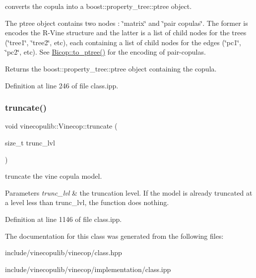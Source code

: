 converts the copula into a boost\+::property\+\_\+tree\+::ptree object. 

The {\ttfamily ptree} object contains two nodes \+: {\ttfamily \char`\"{}matrix\char`\"{}} and {\ttfamily \char`\"{}pair copulas\char`\"{}}. The former is encodes the R-\/\+Vine structure and the latter is a list of child nodes for the trees ({\ttfamily \char`\"{}tree1\char`\"{}}, {\ttfamily \char`\"{}tree2\char`\"{}}, etc), each containing a list of child nodes for the edges ({\ttfamily \char`\"{}pc1\char`\"{}}, {\ttfamily \char`\"{}pc2\char`\"{}}, etc). See \hyperlink{classvinecopulib_1_1_bicop_a74397cf5f843f5aebb436a49322dd2f9}{Bicop\+::to\+\_\+ptree()} for the encoding of pair-\/copulas.

\begin{DoxyReturn}{Returns}
the boost\+::property\+\_\+tree\+::ptree object containing the copula. 
\end{DoxyReturn}


Definition at line 246 of file class.\+ipp.

\mbox{\label{classvinecopulib_1_1_vinecop_ac77812a69ccd568b7eb0c21658001640}} 
\subsubsection{\texorpdfstring{truncate()}{truncate()}}
{\footnotesize\ttfamily void vinecopulib\+::\+Vinecop\+::truncate (\begin{DoxyParamCaption}\item[{size\+\_\+t}]{trunc\+\_\+lvl }\end{DoxyParamCaption})\hspace{0.3cm}{\ttfamily [inline]}}



truncate the vine copula model. 


\begin{DoxyParams}{Parameters}
{\em trunc\+\_\+lvl} & the truncation level. If the model is already truncated at a level less than {\ttfamily trunc\+\_\+lvl}, the function does nothing. \\
\hline
\end{DoxyParams}


Definition at line 1146 of file class.\+ipp.



The documentation for this class was generated from the following files\+:\begin{DoxyCompactItemize}
\item 
include/vinecopulib/vinecop/class.\+hpp\item 
include/vinecopulib/vinecop/implementation/class.\+ipp\end{DoxyCompactItemize}
